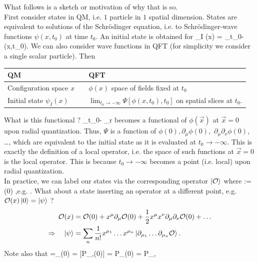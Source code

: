 What follows is a sketch or motivation of why that is so.\\
First consider states in QM, i.e. $1$ particle in $1$ spatial dimension. States are equivalent to solutions of the Schrödinger equation, i.e. to Schrödinger-wave functions $\psi(x,t_0)$ at time $t_0$. An initial state is obtained for
\bse 
\psi_{I} (x) = \lim_{t_0\rightarrow - \infty} \psi(x,t_0).
\ese 
We can also consider wave functions in QFT (for simplicity we consider a single scalar particle). Then
\bse 
 \begin{tabular}{|lll|}
	QM & \longrightarrow & QFT \\
	\toprule
Configuration space $x$ && $\phi(x)$ space of fields fixed at $t_0$ \\
Initial state $\psi_I(x)$ && $\lim_{t_0\rightarrow -\infty} \Psi\left[\phi(x,t_0),t_0\right]$ on spatial slices at $t_0$.\\
	\bottomrule 
\end{tabular}
\ese 
What is this functional ?
\bse 
\lim_{t_0\rightarrow -\infty} \Psi{} \lim_{r} \Psi{} 
\ese 
becomes a functional of $\phi(\vec{x})$ at $\vec{x}=0$ upon radial quantization. Thus, $\Psi$ is a function of $\phi(0),\partial_\mu \phi(0),$ $\partial_\mu \partial_\nu \phi(0)$, \dots, which are equivalent to the initial state as it is evaluated at $t_0\rightarrow -\infty$. This is exactly the definition of a local operator, i.e. the space of such functions at $\vec{x}=0$ is the local operator. This is because $t_0 \rightarrow -\infty$ becomes a point (i.e. local) upon radial quantization.\\
In practice, we can label our states via the corresponding operator $\ket{\mathcal{O}}$ where 
\bse 
\ket{\mO}:= \mO(0) ,\quad e.g. \hat{ \mI} \leftrightarrow {}\equiv \ket{\mI}.
\ese
{}
What about a state inserting an operator at a different point, e.g. $\mathcal{O}(x) \ket{0} = \ket{\psi}$ ?
\begin{align*}
\mathcal{O}(x) & = \mathcal{O}(0) + x^\mu \partial_\mu \mathcal{O}(0) + \frac{1}{2} x^\mu x^\nu \partial_\mu \partial_\nu \mathcal{O}(0) + \dots \\
\Rightarrow \quad \ket{\psi}&= \sum_n \frac{1}{n!} x^{\mu_1} \dots x^{\mu_n} \ket{\partial_{\mu_1} \dots \partial_{\mu_n} \mathcal{O}}.
\end{align*}
Note also that 
\bse
\ket{\partial_\mu \mO} =\partial_\mu \mO(0)  = [P_\mu,\mO(0)] = P_\mu \mO(0)  = P_\mu \ket{\mO}, 
